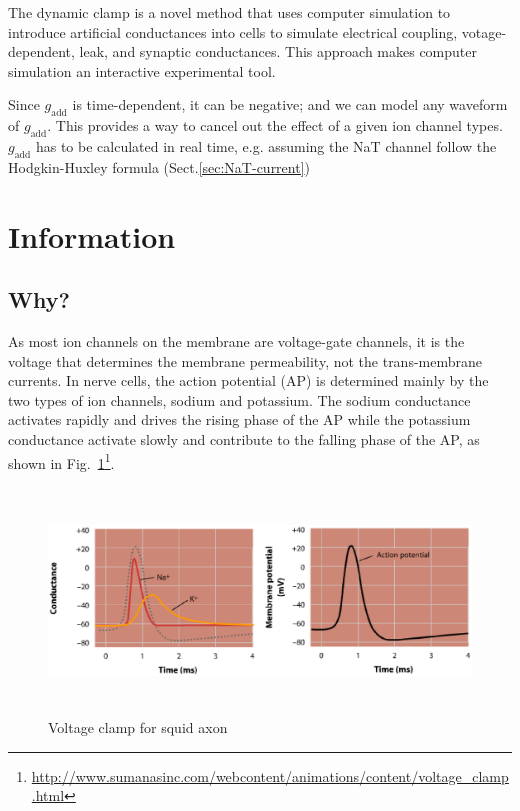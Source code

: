 The dynamic clamp is a novel method that uses computer simulation to introduce
artificial conductances into cells to simulate electrical coupling,
votage-dependent, leak, and synaptic conductances.  This approach makes computer
simulation an interactive experimental tool.

Since $g_\text{add}$ is time-dependent, it can be negative; and we can model any
waveform of $g_\text{add}$. This provides a way to cancel out the effect of a
given ion channel types. $g_\text{add}$	 has to be calculated in real time, e.g.
assuming the NaT channel follow the Hodgkin-Huxley formula 
(Sect.\ref{sec:NaT-current})


\section{Information}
\subsection{Why?}
\label{sec:why}

As most ion channels on the membrane are voltage-gate channels, it is the
voltage that determines the membrane permeability, not the trans-membrane
currents. In nerve cells, the action potential (AP) is determined mainly by the
two types of ion channels, sodium and potassium. The sodium conductance
activates rapidly and drives the rising phase of the AP while the potassium
conductance activate slowly and contribute to the falling phase of the AP, as
shown in
Fig.~\ref{fig:AP_diagram}\footnote{\url{http://www.sumanasinc.com/webcontent/animations/content/voltage_clamp.html}}.

\begin{figure}[htb]
  \centerline{\includegraphics[height=6cm]{./images/AP_diagram.eps}}
  \caption{Voltage clamp for squid axon}\label{fig:AP_diagram}
\end{figure}

